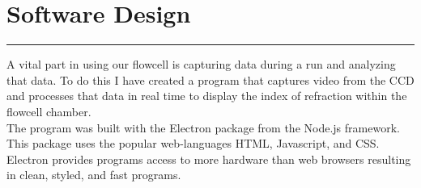 \documentclass{report}
\begin{document}
\begin{flushleft}
\begin{figure}[h]
	\end{figure}
	
	\section*{Software Design}
	\vspace{-0.1cm}\hrule\vspace{0.2cm}
	A vital part in using our flowcell is capturing data during a run and analyzing that data. To do this I have created a program that captures video from the CCD and processes that data in real time to display the index of refraction within the flowcell chamber.\\
	The program was built with the Electron package from the Node.js framework. This package uses the popular web-languages HTML, Javascript, and CSS. Electron provides programs access to more hardware than web browsers resulting in clean, styled, and fast programs.

\end{flushleft}
\end{document}
